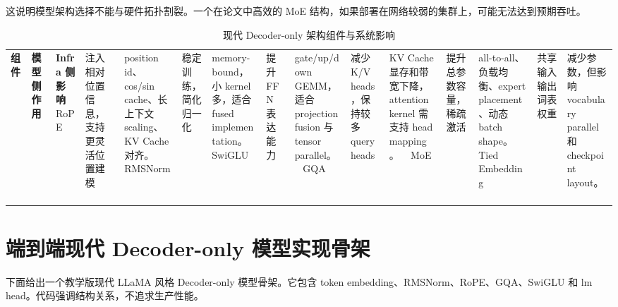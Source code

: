 这说明模型架构选择不能与硬件拓扑割裂。一个在论文中高效的 MoE 结构，如果部署在网络较弱的集群上，可能无法达到预期吞吐。

\begin{table}[H]
\centering
\small
\caption{现代 Decoder-only 架构组件与系统影响}
\label{tab:decoder-component-system-impact}
\begin{tabular}{p{}p{}p{}}
\toprule
\textbf{组件} & \textbf{模型侧作用} & \textbf{Infra 侧影响} \
\midrule
RoPE
& 注入相对位置信息，支持更灵活位置建模
& position id、cos/sin cache、长上下文 scaling、KV Cache 对齐。 \
\midrule
RMSNorm
& 稳定训练，简化归一化
& memory-bound，小 kernel 多，适合 fused implementation。 \
\midrule
SwiGLU
& 提升 FFN 表达能力
& gate/up/down GEMM，适合 projection fusion 与 tensor parallel。 \
\midrule
GQA
& 减少 K/V heads，保持较多 query heads
& KV Cache 显存和带宽下降，attention kernel 需支持 head mapping。 \
\midrule
MoE
& 提升总参数容量，稀疏激活
& all-to-all、负载均衡、expert placement、动态 batch shape。 \
\midrule
Tied Embedding
& 共享输入输出词表权重
& 减少参数，但影响 vocabulary parallel 和 checkpoint layout。 \
\bottomrule
\end{tabular}
\end{table}

\section{端到端现代 Decoder-only 模型实现骨架}
\label{sec:modern-decoder-only-code-skeleton}

下面给出一个教学版现代 LLaMA 风格 Decoder-only 模型骨架。它包含 token embedding、RMSNorm、RoPE、GQA、SwiGLU 和 lm head。代码强调结构关系，不追求生产性能。


